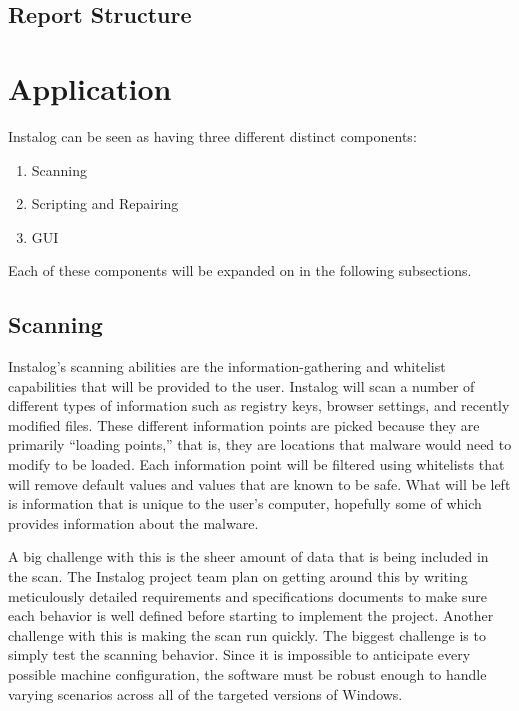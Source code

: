\documentclass[letterpaper,12pt]{article}
\begin{document}
\subsection{Report Structure}

\newpage



\section{Application}
Instalog can be seen as having three different distinct components:

\begin{enumerate}
  \item Scanning
  \item Scripting and Repairing
  \item GUI
\end{enumerate}

Each of these components will be expanded on in the following subsections.

\subsection{Scanning}
Instalog's scanning abilities are the information-gathering and whitelist
capabilities that will be provided to the user.  Instalog will scan a number of
different types of information such as registry keys, browser settings, and
recently modified files.  These different information points are picked because
they are primarily ``loading points,'' that is, they are locations that malware
would need to modify to be loaded.  Each information point will be filtered
using whitelists that will remove default values and values that are known to be
safe.  What will be left is information that is unique to the user's computer,
hopefully some of which provides information about the malware.

A big challenge with this is the sheer amount of data that is being included in
the scan.  The Instalog project team plan on getting around this by writing
meticulously detailed requirements and specifications documents to make sure
each behavior is well defined before starting to implement the project.
Another challenge with this is making the scan run quickly.  The biggest
challenge is to simply test the scanning behavior.  Since it is impossible to
anticipate every possible machine configuration, the software must be robust
enough to handle varying scenarios across all of the targeted versions of
Windows.
\end{document}
